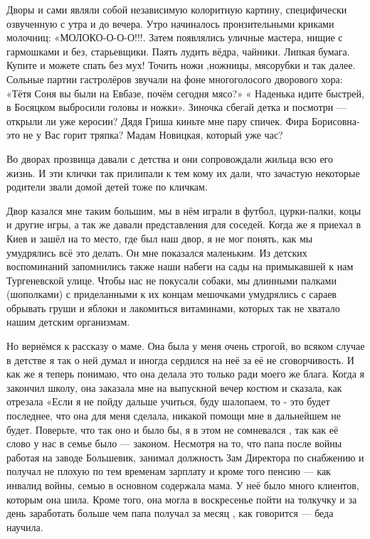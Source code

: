 Дворы и
сами являли собой независимую колоритную картину, специфически озвученную с
утра и до вечера. Утро начиналось пронзительными криками молочниц:
«МОЛОКО-О-О-О!!!. Затем появлялись уличные мастера, нищие с гармошками и без,
старьевщики. Паять лудить вёдра, чайники. Липкая бумага. Купите и можете спать
без мух! Точить ножи ,ножницы, мясорубки и так далее. Сольные партии
гастролёров звучали на фоне многоголосого дворового хора: «Тётя Соня вы были
на Евбазе, почём сегодня мясо?» « Наденька  идите быстрей, в Босяцком выбросили
головы и ножки». Зиночка сбегай детка и посмотри — открыли ли уже керосин?
Дядя Гриша киньте мне пару спичек. Фира Борисовна- это не у Вас горит тряпка?
Мадам Новицкая, который уже час? 

Во дворах прозвища давали  с детства и они
сопровождали жильца всю его жизнь. И эти клички так прилипали к тем кому их
дали, что зачастую  некоторые родители   звали  домой детей тоже по кличкам.

Двор казался мне таким большим, мы в нём играли в футбол, цурки-палки, коцы и
другие игры,  а так же давали представления для соседей. Когда же я приехал в
Киев и зашёл на то место, где  был наш двор, я не мог понять, как мы
умудрялись всё это делать. Он мне показался маленьким. Из детских воспоминаний
запомнились также наши набеги на сады на примыкавшей к нам Тургеневской улице.
Чтобы нас не покусали собаки, мы длинными палками (шополками) с приделанными к
их концам мешочками умудрялись с сараев  обрывать груши и яблоки  и лакомиться
витаминами, которых так не хватало нашим детским организмам.

Но вернёмся к рассказу о маме. Она была у меня очень строгой, во всяком случае
в детстве я так о ней думал и иногда сердился на неё за её не сговорчивость. И
как же я теперь понимаю, что она  делала это только ради моего же блага.  Когда
я закончил школу, она заказала мне на выпускной вечер костюм и сказала, как
отрезала «Если я не пойду дальше учиться, буду шалопаем, то - это  будет
последнее, что она для меня сделала, никакой помощи мне в дальнейшем  не будет.
Поверьте, что так оно и было бы, я в этом не сомневался , так как её слово у
нас в семье было — законом. Несмотря на то, что папа после войны работая на
заводе Большевик, занимал должность Зам Директора по снабжению  и получал не
плохую по тем временам  зарплату и кроме того пенсию — как инвалид войны, семью
в основном содержала мама.  У неё было много клиентов, которым она шила. Кроме
того, она могла в воскресенье пойти на толкучку и за день заработать больше
чем папа  получал за месяц , как говорится — беда научила.

